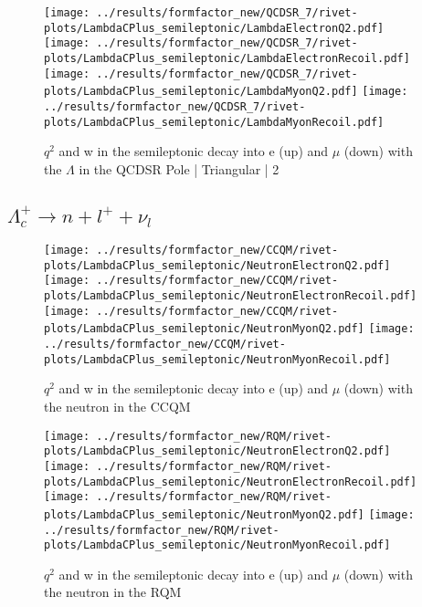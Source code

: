 \begin{figure}[h]
  \centering
  \texttt{[image: ../results/formfactor\_new/QCDSR\_7/rivet-plots/LambdaCPlus\_semileptonic/LambdaElectronQ2.pdf]}
  \texttt{[image: ../results/formfactor\_new/QCDSR\_7/rivet-plots/LambdaCPlus\_semileptonic/LambdaElectronRecoil.pdf]}\\
  \texttt{[image: ../results/formfactor\_new/QCDSR\_7/rivet-plots/LambdaCPlus\_semileptonic/LambdaMyonQ2.pdf]}
  \texttt{[image: ../results/formfactor\_new/QCDSR\_7/rivet-plots/LambdaCPlus\_semileptonic/LambdaMyonRecoil.pdf]}
  \caption{\(q^2\) and w in the semileptonic decay into e (up) and \(\mu\) (down) with the \(\Lambda\) in the QCDSR Pole | Triangular | 2}
\end{figure}

\subsection{\(\Lambda_c^+ \rightarrow n + l^+ + \nu_l\)}
\begin{figure}[h]
  \centering
  \texttt{[image: ../results/formfactor\_new/CCQM/rivet-plots/LambdaCPlus\_semileptonic/NeutronElectronQ2.pdf]}
  \texttt{[image: ../results/formfactor\_new/CCQM/rivet-plots/LambdaCPlus\_semileptonic/NeutronElectronRecoil.pdf]}\\
  \texttt{[image: ../results/formfactor\_new/CCQM/rivet-plots/LambdaCPlus\_semileptonic/NeutronMyonQ2.pdf]}
  \texttt{[image: ../results/formfactor\_new/CCQM/rivet-plots/LambdaCPlus\_semileptonic/NeutronMyonRecoil.pdf]}
  \caption{\(q^2\) and w in the semileptonic decay into e (up) and \(\mu\) (down) with the neutron in the CCQM}
\end{figure}

\begin{figure}[h]
  \centering
  \texttt{[image: ../results/formfactor\_new/RQM/rivet-plots/LambdaCPlus\_semileptonic/NeutronElectronQ2.pdf]}
  \texttt{[image: ../results/formfactor\_new/RQM/rivet-plots/LambdaCPlus\_semileptonic/NeutronElectronRecoil.pdf]}\\
  \texttt{[image: ../results/formfactor\_new/RQM/rivet-plots/LambdaCPlus\_semileptonic/NeutronMyonQ2.pdf]}
  \texttt{[image: ../results/formfactor\_new/RQM/rivet-plots/LambdaCPlus\_semileptonic/NeutronMyonRecoil.pdf]}
  \caption{\(q^2\) and w in the semileptonic decay into e (up) and \(\mu\) (down) with the neutron in the RQM}
\end{figure}
